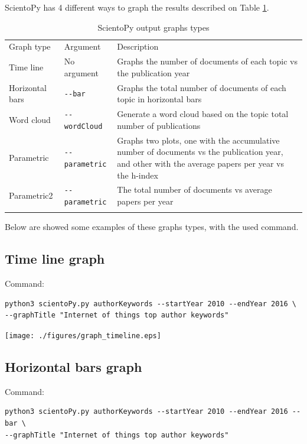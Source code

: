 \documentclass[10pt,letterpaper]{article}
\begin{document}
ScientoPy has 4 different ways to graph the results described on Table \ref{table_graph_types}.

\begin{table}[h]
	\centering
	\caption{ScientoPy output graphs types}
	\label{table_graph_types}

	\begin{tabular}{ p{4cm} p{3cm} p{10cm}}
	\hline\noalign{\smallskip}
	Graph type     &  Argument & Description                             \\
	\noalign{\smallskip}\hline\noalign{\smallskip}                                                                         
	Time line      & No argument & Graphs the number of documents of each topic vs the publication year \\
	Horizontal bars  & \verb|--bar| & Graphs the total number of documents of each topic in horizontal bars \\
	Word cloud     & \verb|--wordCloud| & Generate a word cloud based on the topic total number of publications \\
	Parametric     & \verb|--parametric| & Graphs two plots, one with the accumulative number of documents vs the publication year, and other with the average papers per year vs the h-index\\
	Parametric2    & \verb|--parametric| & The total number of documents vs average papers per year\\
	\noalign{\smallskip}\hline
	\end{tabular}
\end{table}

Below are showed some examples of these graphs types, with the used command.

\subsection{Time line graph}
Command: 
\begin{verbatim}
python3 scientoPy.py authorKeywords --startYear 2010 --endYear 2016 \
--graphTitle "Internet of things top author keywords" 
\end{verbatim}

\begin{center}
	\texttt{[image: ./figures/graph\_timeline.eps]}
\end{center}


\subsection{Horizontal bars graph}
Command: 
\begin{verbatim}
python3 scientoPy.py authorKeywords --startYear 2010 --endYear 2016 --bar \
--graphTitle "Internet of things top author keywords"
\end{verbatim}
\end{document}
